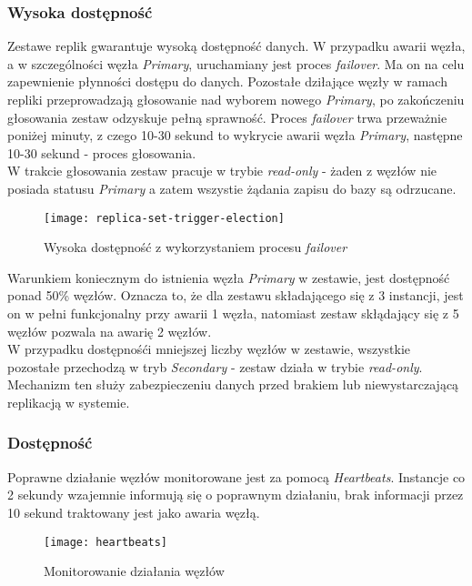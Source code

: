 \subsubsection{Wysoka dostępność}
Zestawe replik gwarantuje wysoką dostępność danych. W przypadku awarii węzła, a w szczególności węzła \textit{Primary}, uruchamiany jest proces \textit{failover}. Ma on na celu zapewnienie płynności dostępu do danych. Pozostałe dziłające węzły w ramach repliki przeprowadzają głosowanie nad wyborem nowego \textit{Primary}, po zakończeniu głosowania zestaw odzyskuje pełną sprawność. Proces \textit{failover} trwa przeważnie poniżej minuty, z czego 10-30 sekund to wykrycie awarii węzła \textit{Primary}, następne 10-30 sekund - proces głosowania. \\
W trakcie głosowania zestaw pracuje w trybie \textit{read-only} - żaden z węzłów nie posiada statusu \textit{Primary} a zatem wszystie żądania zapisu do bazy są odrzucane. \\

\begin{figure}[H]
	\centering
	\texttt{[image: replica-set-trigger-election]}
	\caption{Wysoka dostępność z wykorzystaniem procesu \textit{failover}}
\end{figure}

Warunkiem koniecznym do istnienia węzła \textit{Primary} w zestawie, jest dostępność ponad 50\% węzłów. Oznacza to, że dla zestawu składającego się z 3 instancji, jest on w pełni funkcjonalny przy awarii 1 węzła, natomiast zestaw skłądający się z 5 węzłów pozwala na awarię 2 węzłów. \\
W przypadku dostępnośći mniejszej liczby węzłów w zestawie, wszystkie pozostałe przechodzą w tryb \textit{Secondary} - zestaw działa w trybie \textit{read-only}. Mechanizm ten służy zabezpieczeniu danych przed brakiem lub niewystarczającą replikacją w systemie.

\subsubsection{Dostępność}
Poprawne działanie węzłów monitorowane jest za pomocą \textit{Heartbeats}. Instancje co 2 sekundy wzajemnie informują się o poprawnym działaniu, brak informacji przez 10 sekund traktowany jest jako awaria węzłą.

\begin{figure}[H]
	\centering
	\texttt{[image: heartbeats]}
	\caption{Monitorowanie działania węzłów}
\end{figure}
